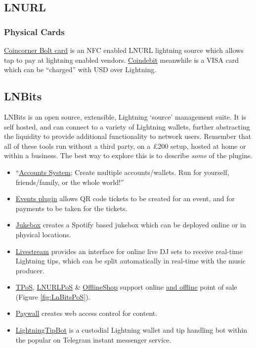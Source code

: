 \subsection{LNURL}
\lipsum[50]
\subsubsection{Physical Cards}
\href{https://www.coincorner.com/theboltcard}{Coincorner Bolt card} is an NFC enabled LNURL lightning source which allows tap to pay at lightning enabled vendors. \href{https://www.coindebit.io/}{Coindebit} meanwhile is a VISA card which can be ``charged'' with USD over Lightning.
\subsection{LNBits}
LNBits is an open source, extensible, Lightning `source' management suite. It is self hosted, and can connect to a variety of Lightning wallets, further abstracting the liquidity to provide additional functionality to network users. Remember that all of these tools run without a third party, on a £200 setup, hosted at home or within a business. The best way to explore this is to describe \textit{some} of the plugins. 
\begin{itemize}
\item ``\href{https://github.com/lnbits/lnbits-legend#lnbits-v03-beta-free-and-open-source-lightning-network-walletaccounts-system}{Accounts System}; Create multiple accounts/wallets. Run for yourself, friends/family, or the whole world!''
\item \href{https://github.com/lnbits/lnbits-legend/tree/quart/lnbits/extensions/events#events}{Events plugin} allows QR code tickets to be created for an event, and for payments to be taken for the tickets.
\item \href{https://github.com/lnbits/lnbits-legend/tree/quart/lnbits/extensions/jukebox#jukebox}{Jukebox} creates a Spotify based jukebox which can be deployed online or in physical locations.
\item \href{https://github.com/lnbits/lnbits-legend/tree/quart/lnbits/extensions/livestream#dj-livestream}{Livestream} provides an interface for online live DJ sets to receive real-time Lightning tips, which can be split automatically in real-time with the music producer.
\item \href{https://github.com/lnbits/lnbits-legend/tree/quart/lnbits/extensions/tpos#tpos}{TPoS}, \href{https://github.com/arcbtc/LNURLPoS#lnurlpos}{LNURLPoS} \& \href{https://github.com/lnbits/lnbits-legend/tree/quart/lnbits/extensions/watchonly#watch-only-wallet}{OfflineShop} support online \href{https://rapaygo.com/}{and offline} point of sale (Figure \ref{fig:LnBitsPoS}).
\item \href{https://github.com/lnbits/lnbits-legend/tree/quart/lnbits/extensions/paywall#paywall}{Paywall} creates web access control for content. 
\item \href{https://github.com/LightningTipBot/LightningTipBot#lightningtipbot-}{LightningTipBot} is a custodial Lightning wallet and tip handling bot within the popular on Telegram instant messenger service.
\end{itemize}

